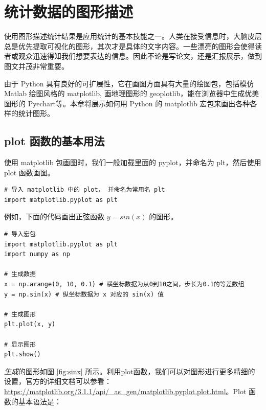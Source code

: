 \chapter{统计数据的图形描述}

使用图形描述统计结果是应用统计的基本技能之一。人类在接受信息时，大脑皮层总是优先提取可视化的图形，其次才是具体的文字内容。一些漂亮的图形会使得读者或观众迅速得知我们想要表达的信息。因此不论是写论文，还是汇报展示，做到图文并茂非常重要。

由于 Python 具有良好的可扩展性，它在画图方面具有大量的绘图包，包括模仿 Matlab 绘图风格的 matplotlib, 画地理图形的  geoplotlib，能在浏览器中生成优美图形的 Pyechart等。本章将展示如何用 Python 的 matplotlib 宏包来画出各种各样的统计图形。

\section{plot 函数的基本用法}

使用 matplotlib 包画图时，我们一般加载里面的 pyplot，并命名为 plt，然后使用 plot 函数画图。


\begin{lstlisting}[Language=Python]
# 导入 matplotlib 中的 plot， 并命名为常用名 plt
import matplotlib.pyplot as plt
\end{lstlisting}

例如，下面的代码画出正弦函数 $y=sin(x)$ 的图形。


\begin{lstlisting}[Language=Python]
# 导入宏包
import matplotlib.pyplot as plt
import numpy as np

# 生成数据
x = np.arange(0, 10, 0.1) # 横坐标数据为从0到10之间，步长为0.1的等差数组
y = np.sin(x) # 纵坐标数据为 x 对应的 sin(x) 值

# 生成图形
plt.plot(x, y)

# 显示图形
plt.show()

\end{lstlisting}
\sloppy %


\textit{生成}的图形如图 \ref{fig:sinx} 所示。利用plot函数，我们可以对图形进行更多精细的设置，官方的详细文档可以参看： \href{https://matplotlib.org/3.1.1/api/\_as\_gen/matplotlib.pyplot.plot.html}{https://matplotlib.org/3.1.1/api/\_as\_gen/matplotlib.pyplot.plot.html}。Plot 函数的基本语法是：

